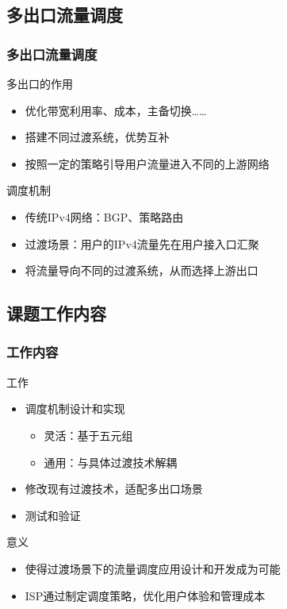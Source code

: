 \documentclass{beamer}
\begin{document}
\subsection{多出口流量调度}
\begin{frame}
  \frametitle{多出口流量调度}

  \begin{block}{多出口的作用}
    \begin{itemize}
    \item 优化带宽利用率、成本，主备切换……
    \item 搭建不同过渡系统，优势互补
    \item 按照一定的策略引导用户流量进入不同的上游网络
    \end{itemize}
  \end{block}

  \begin{block}{调度机制}
    \begin{itemize}
    \item 传统IPv4网络：BGP、策略路由
    \item 过渡场景：用户的IPv4流量先在用户接入口汇聚
    \item 将流量导向不同的过渡系统，从而选择上游出口
    \end{itemize}
  \end{block}
\end{frame}

\subsection{课题工作内容}
\begin{frame}
  \frametitle{工作内容}

  \begin{block}{工作}
    \begin{itemize}
    \item 调度机制设计和实现
      \begin{itemize}
      \item 灵活：基于五元组
      \item 通用：与具体过渡技术解耦
      \end{itemize}
    \item 修改现有过渡技术，适配多出口场景
    \item 测试和验证
    \end{itemize}
  \end{block}

  \begin{block}{意义}
    \begin{itemize}
    \item 使得过渡场景下的流量调度应用设计和开发成为可能
    \item ISP通过制定调度策略，优化用户体验和管理成本
    \end{itemize}
  \end{block}
\end{frame}
\end{document}
